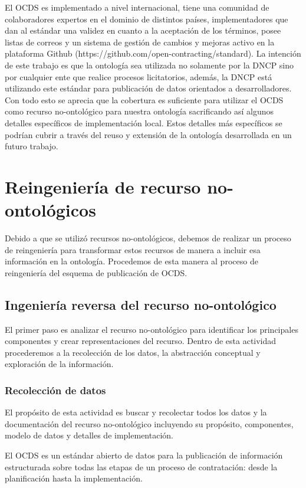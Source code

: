 El OCDS es implementado a nivel internacional, tiene una comunidad de colaboradores expertos en el dominio de distintos países, implementadores que dan al estándar una validez en cuanto a la aceptación de los términos, posee listas de correos y un sistema de gestión de cambios y mejoras activo en la plataforma Github (https://github.com/open-contracting/standard). La intención de este trabajo es que la ontología sea utilizada no solamente por la DNCP sino por cualquier ente que realice procesos licitatorios, además, la DNCP está utilizando este estándar para publicación de datos orientados a desarrolladores. Con todo esto se aprecia que la cobertura es suficiente para utilizar el OCDS como recurso no-ontológico para nuestra ontología sacrificando así algunos detalles específicos de implementación local. Estos detalles más específicos se podrían cubrir a través del reuso y extensión de la ontología desarrollada en un futuro trabajo.

\section{Reingeniería de recurso no-ontológicos}
Debido a que se utilizó recursos no-ontológicos, debemos de realizar un proceso de reingeniería para transformar estos recursos de manera a incluir esa información en la ontología. Procedemos de esta manera al proceso de reingeniería del esquema de publicación de OCDS.

\subsection{Ingeniería reversa del recurso no-ontológico}
El primer paso es analizar el recurso no-ontológico para identificar los principales componentes y crear representaciones del recurso. Dentro de esta actividad procederemos a la recolección de los datos, la abstracción conceptual y exploración de la información.

\subsubsection{Recolección de datos}

El propósito de esta actividad es buscar y recolectar todos los datos y la documentación del recurso no-ontológico incluyendo su propósito, componentes, modelo de datos y detalles de implementación.

El OCDS es un estándar abierto de datos para la publicación de información estructurada sobre todas las etapas de un proceso de contratación: desde la planificación hasta la implementación.

